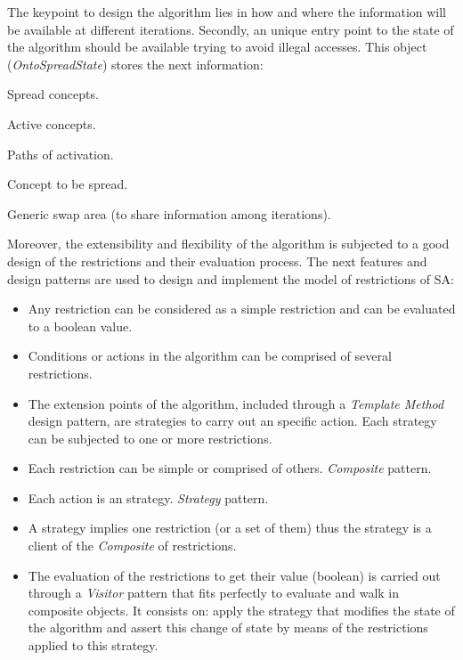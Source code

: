 The keypoint to design the algorithm lies in how and where
the information will be available at different iterations. Secondly, an unique entry point
to the state of the algorithm should be available trying to avoid
illegal accesses. This object (\textit{OntoSpreadState}) stores the next information: \begin{inparaenum}\item Spread
concepts. \item Active concepts. \item Paths of activation. \item Concept to be
spread. \item Generic swap area (to share information among iterations). \end{inparaenum}
Moreover, the extensibility and flexibility of the algorithm is subjected to a good design
of the restrictions and their evaluation process. The next features and design patterns 
are used to design and implement the model of restrictions of SA:
\begin{itemize}
  \item Any restriction can be considered as a simple restriction and can be
evaluated to a boolean value.
  \item Conditions or actions in the algorithm can be comprised of several
restrictions.
  \item The extension points of the algorithm, included through a
\textit{Template Method} design pattern, are strategies to carry out an specific
action. Each strategy can be subjected to one or more restrictions.
\item Each restriction can be simple or comprised of others. \textit{Composite} pattern.
  \item Each action is an strategy. \textit{Strategy} pattern.
  \item A strategy implies one restriction (or a set of them) thus the strategy
is a client of the \textit{Composite} of restrictions.
  \item The evaluation of the restrictions to get their value (boolean) is
carried out through a \textit{Visitor} pattern that fits perfectly to evaluate and walk in
composite objects. It consists on: apply the strategy that modifies the state
of the algorithm and assert this change of state by means of the restrictions applied
to this strategy.
\end{itemize}

